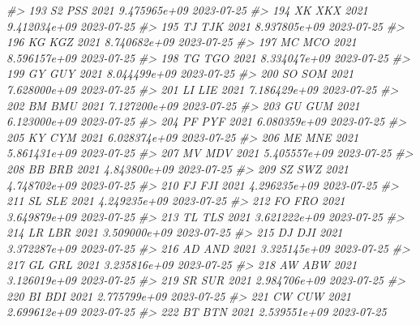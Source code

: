 \documentclass[
  xelatex, ja=standard]{bxjsbook}
\newenvironment{Shaded}{\begin{snugshade}}{\end{snugshade}}
\newcommand{\CommentTok}[1]{\textcolor[rgb]{0.56,0.35,0.01}{\textit{#1}}}
\theoremstyle{definition}
\theoremstyle{definition}
\theoremstyle{definition}
\theoremstyle{definition}
\theoremstyle{remark}
\begin{document}
\begin{Shaded}
\begin{Highlighting}[]
\CommentTok{\#\textgreater{} 193    S2   PSS 2021 9.475965e+09         2023{-}07{-}25}
\CommentTok{\#\textgreater{} 194    XK   XKX 2021 9.412034e+09         2023{-}07{-}25}
\CommentTok{\#\textgreater{} 195    TJ   TJK 2021 8.937805e+09         2023{-}07{-}25}
\CommentTok{\#\textgreater{} 196    KG   KGZ 2021 8.740682e+09         2023{-}07{-}25}
\CommentTok{\#\textgreater{} 197    MC   MCO 2021 8.596157e+09         2023{-}07{-}25}
\CommentTok{\#\textgreater{} 198    TG   TGO 2021 8.334047e+09         2023{-}07{-}25}
\CommentTok{\#\textgreater{} 199    GY   GUY 2021 8.044499e+09         2023{-}07{-}25}
\CommentTok{\#\textgreater{} 200    SO   SOM 2021 7.628000e+09         2023{-}07{-}25}
\CommentTok{\#\textgreater{} 201    LI   LIE 2021 7.186429e+09         2023{-}07{-}25}
\CommentTok{\#\textgreater{} 202    BM   BMU 2021 7.127200e+09         2023{-}07{-}25}
\CommentTok{\#\textgreater{} 203    GU   GUM 2021 6.123000e+09         2023{-}07{-}25}
\CommentTok{\#\textgreater{} 204    PF   PYF 2021 6.080359e+09         2023{-}07{-}25}
\CommentTok{\#\textgreater{} 205    KY   CYM 2021 6.028374e+09         2023{-}07{-}25}
\CommentTok{\#\textgreater{} 206    ME   MNE 2021 5.861431e+09         2023{-}07{-}25}
\CommentTok{\#\textgreater{} 207    MV   MDV 2021 5.405557e+09         2023{-}07{-}25}
\CommentTok{\#\textgreater{} 208    BB   BRB 2021 4.843800e+09         2023{-}07{-}25}
\CommentTok{\#\textgreater{} 209    SZ   SWZ 2021 4.748702e+09         2023{-}07{-}25}
\CommentTok{\#\textgreater{} 210    FJ   FJI 2021 4.296235e+09         2023{-}07{-}25}
\CommentTok{\#\textgreater{} 211    SL   SLE 2021 4.249235e+09         2023{-}07{-}25}
\CommentTok{\#\textgreater{} 212    FO   FRO 2021 3.649879e+09         2023{-}07{-}25}
\CommentTok{\#\textgreater{} 213    TL   TLS 2021 3.621222e+09         2023{-}07{-}25}
\CommentTok{\#\textgreater{} 214    LR   LBR 2021 3.509000e+09         2023{-}07{-}25}
\CommentTok{\#\textgreater{} 215    DJ   DJI 2021 3.372287e+09         2023{-}07{-}25}
\CommentTok{\#\textgreater{} 216    AD   AND 2021 3.325145e+09         2023{-}07{-}25}
\CommentTok{\#\textgreater{} 217    GL   GRL 2021 3.235816e+09         2023{-}07{-}25}
\CommentTok{\#\textgreater{} 218    AW   ABW 2021 3.126019e+09         2023{-}07{-}25}
\CommentTok{\#\textgreater{} 219    SR   SUR 2021 2.984706e+09         2023{-}07{-}25}
\CommentTok{\#\textgreater{} 220    BI   BDI 2021 2.775799e+09         2023{-}07{-}25}
\CommentTok{\#\textgreater{} 221    CW   CUW 2021 2.699612e+09         2023{-}07{-}25}
\CommentTok{\#\textgreater{} 222    BT   BTN 2021 2.539551e+09         2023{-}07{-}25}

\end{Highlighting}
\end{Shaded}
\end{document}
